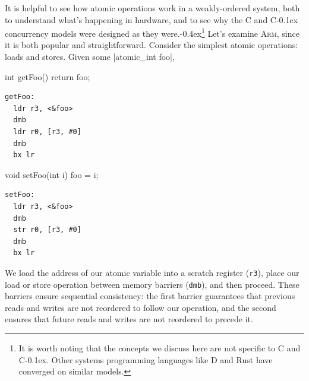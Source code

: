 \documentclass[fontsize=10pt, oneside]{scrartcl}
\newcommand{\punckern}{\kern-0.4ex}
\newcommand{\monobox}[1]{\mbox{\texttt{#1}}}
\newcommand{\keyword}[1]{\monobox{\color{darkGreen}#1}}
\newcommand{\cplusplus}[1]{C\kern-0.1ex\raisebox{0.15ex}{\texttt{++}}}
\newcommand{\clang}[1]{C}
\begin{document}
It is helpful to see how atomic operations work in a weakly-ordered system,
both to understand what's happening in hardware,
and to see why the \clang{} and \cplusplus{} concurrency models were designed as they were.\punckern\footnote{%
It is worth noting that the concepts we discuss here are not specific to \clang{} and \cplusplus{}.
Other systems programming languages like D and Rust have converged on similar models.}
Let's examine \textsc{Arm}, since it is both popular and straightforward.
Consider the simplest atomic operations: loads and stores.
Given some \cc|atomic_int foo|,
\newline
\begin{minipage}{0.35\linewidth}
\begin{ccode}
int getFoo()
{
    return foo;
}
\end{ccode}
\end{minipage}
\begin{minipage}{0.43\linewidth}
\begin{lstlisting}[language={[ARM]Assembler}]
getFoo:
  ldr r3, <&foo>
  dmb
  ldr r0, [r3, #0]
  dmb
  bx lr
\end{lstlisting}
\end{minipage}
\begin{minipage}{0.35\linewidth}
\begin{ccode}
void setFoo(int i)
{
    foo = i;
}
\end{ccode}
\end{minipage}
\begin{minipage}{0.43\linewidth}
\begin{lstlisting}[language={[ARM]Assembler}]
setFoo:
  ldr r3, <&foo>
  dmb
  str r0, [r3, #0]
  dmb
  bx lr
\end{lstlisting}
\end{minipage}
We load the address of our atomic variable into a scratch register (\texttt{r3}),
place our load or store operation between memory barriers (\keyword{dmb}), and then proceed.
These barriers ensure sequential consistency:
the first barrier guarantees that previous reads and writes are not reordered to follow our operation,
and the second ensures that future reads and writes are not reordered to precede it.
\end{document}
